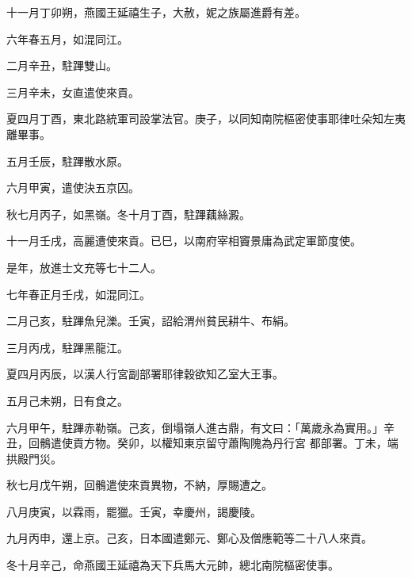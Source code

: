 \begin{pinyinscope}
 十一月丁卯朔，燕國王延禧生子，大赦，妮之族屬進爵有差。



 六年春五月，如混同江。



 二月辛丑，駐蹕雙山。



 三月辛未，女直遣使來貢。



 夏四月丁酉，東北路統軍司設掌法官。庚子，以同知南院樞密使事耶律吐朵知左夷離畢事。



 五月壬辰，駐蹕散水原。



 六月甲寅，遣使決五京囚。



 秋七月丙子，如黑嶺。冬十月丁酉，駐蹕藕絲澱。



 十一月壬戌，高麗遭使來貢。已巳，以南府宰相竇景庸為武定軍節度使。



 是年，放進士文充等七十二人。



 七年春正月壬戌，如混同江。



 二月己亥，駐蹕魚兒濼。壬寅，詔給渭州貧民耕牛、布絹。



 三月丙戌，駐蹕黑龍江。



 夏四月丙辰，以漢人行宮副部署耶律穀欲知乙室大王事。



 五月己未朔，日有食之。



 六月甲午，駐蹕赤勒嶺。己亥，倒塌嶺人進古鼎，有文曰：「萬歲永為實用。」辛丑，回鶻遣使貢方物。癸卯，以權知東京留守蕭陶隗為丹行宮
 都部署。丁未，端拱殿門災。



 秋七月戊午朔，回鶻遣使來貢異物，不納，厚賜遭之。



 八月庚寅，以霖雨，罷獵。壬寅，幸慶州，謁慶陵。



 九月丙申，還上京。己亥，日本國遣鄭元、鄭心及僧應範等二十八人來貢。



 冬十月辛己，命燕國王延禧為天下兵馬大元帥，總北南院樞密使事。




\end{pinyinscope}
